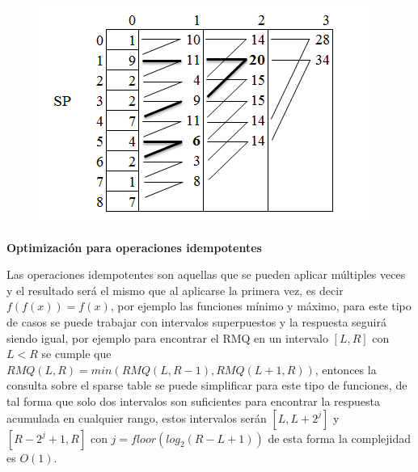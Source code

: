 \documentclass[12pt, a4paper]{article}
\newcommand\cppfile[2][]{

}
\newcommand{\subtitulo}[1]{\begin{center}\textbf{#1}\end{center}}
\begin{document}
	\begin{figure}[!htb]
			\centering
			\includegraphics[scale=0.65]{Estructuras_de_datos/imagenes/sparse_table/consulta}
			\caption{}
			\label{estructuras:sparse_table:consulta}
		\endminipage
			\cppfile[19-27]{Estructuras_de_datos/codigos/sparse_table.cpp}
		\endminipage
	\end{figure}
	
	\subtitulo{Optimización para operaciones idempotentes}
	
	Las operaciones idempotentes son aquellas que se pueden aplicar múltiples veces y el resultado será el mismo que 
	al aplicarse la primera vez, es decir $f(f(x))=f(x)$, por ejemplo las funciones mínimo y máximo, para este tipo 
	de casos se puede trabajar con intervalos superpuestos y la respuesta seguirá siendo igual, por ejemplo para 
	encontrar el RMQ en un intervalo $[L,R]$ con $L < R$ se cumple que $RMQ(L,R) = min(RMQ(L,R-1), RMQ(L+1,R))$, 
	entonces la consulta sobre el sparse table se puede simplificar para este tipo de funciones, de tal forma que 
	solo dos intervalos son suficientes para encontrar la respuesta acumulada en cualquier rango, estos intervalos 
	serán $[L,L+2^j]$ y $[R-2^j+1,R]$ con $j = floor(log_{2}(R-L+1))$ de esta forma la complejidad es $O(1)$.
	\cppfile[29-32]{Estructuras_de_datos/codigos/sparse_table.cpp}

	
	

	
\end{document}
